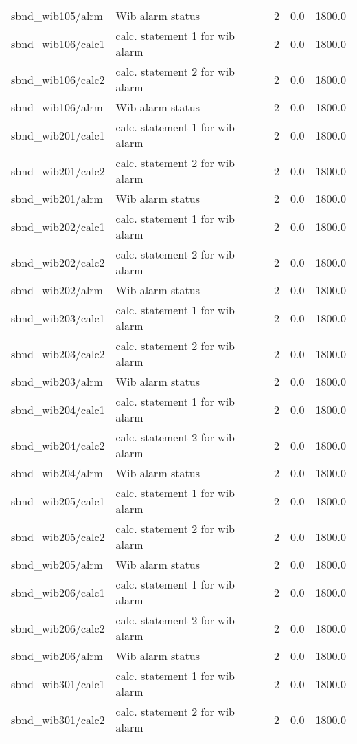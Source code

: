 \begin{center}
\begin{longtable}{l | l l l l }
sbnd\_wib105/alrm & Wib alarm status & 2 & 0.0 & 1800.0\\ 
sbnd\_wib106/calc1 & calc. statement 1 for wib alarm & 2 & 0.0 & 1800.0\\ 
sbnd\_wib106/calc2 & calc. statement 2 for wib alarm & 2 & 0.0 & 1800.0\\ 
sbnd\_wib106/alrm & Wib alarm status & 2 & 0.0 & 1800.0\\ 
sbnd\_wib201/calc1 & calc. statement 1 for wib alarm & 2 & 0.0 & 1800.0\\ 
sbnd\_wib201/calc2 & calc. statement 2 for wib alarm & 2 & 0.0 & 1800.0\\ 
sbnd\_wib201/alrm & Wib alarm status & 2 & 0.0 & 1800.0\\ 
sbnd\_wib202/calc1 & calc. statement 1 for wib alarm & 2 & 0.0 & 1800.0\\ 
sbnd\_wib202/calc2 & calc. statement 2 for wib alarm & 2 & 0.0 & 1800.0\\ 
sbnd\_wib202/alrm & Wib alarm status & 2 & 0.0 & 1800.0\\ 
sbnd\_wib203/calc1 & calc. statement 1 for wib alarm & 2 & 0.0 & 1800.0\\ 
sbnd\_wib203/calc2 & calc. statement 2 for wib alarm & 2 & 0.0 & 1800.0\\ 
sbnd\_wib203/alrm & Wib alarm status & 2 & 0.0 & 1800.0\\ 
sbnd\_wib204/calc1 & calc. statement 1 for wib alarm & 2 & 0.0 & 1800.0\\ 
sbnd\_wib204/calc2 & calc. statement 2 for wib alarm & 2 & 0.0 & 1800.0\\ 
sbnd\_wib204/alrm & Wib alarm status & 2 & 0.0 & 1800.0\\ 
sbnd\_wib205/calc1 & calc. statement 1 for wib alarm & 2 & 0.0 & 1800.0\\ 
sbnd\_wib205/calc2 & calc. statement 2 for wib alarm & 2 & 0.0 & 1800.0\\ 
sbnd\_wib205/alrm & Wib alarm status & 2 & 0.0 & 1800.0\\ 
sbnd\_wib206/calc1 & calc. statement 1 for wib alarm & 2 & 0.0 & 1800.0\\ 
sbnd\_wib206/calc2 & calc. statement 2 for wib alarm & 2 & 0.0 & 1800.0\\ 
sbnd\_wib206/alrm & Wib alarm status & 2 & 0.0 & 1800.0\\ 
sbnd\_wib301/calc1 & calc. statement 1 for wib alarm & 2 & 0.0 & 1800.0\\ 
sbnd\_wib301/calc2 & calc. statement 2 for wib alarm & 2 & 0.0 & 1800.0\\ 

\end{longtable}
\end{center}
